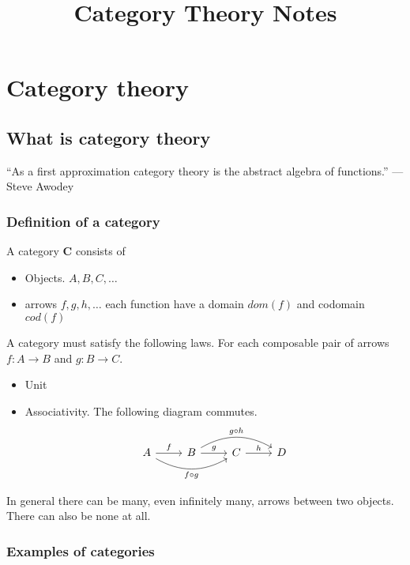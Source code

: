 \documentclass{book}
\title{Category Theory Notes}
\author{}
\theoremstyle{definition}
\begin{document}
\maketitle

\tableofcontents
\newpage

\chapter{Category theory}

\section{What is category theory}

``As a first approximation category theory is the abstract algebra of
functions.'' --- Steve Awodey

\subsection{Definition of a category}

A category $\mathbf{C}$ consists of
\begin{itemize}
\item Objects. $A, B, C, \dots$
  \item arrows $f, g, h, \dots$ each function have a domain $dom(f)$ and
    codomain $cod(f)$
\end{itemize}

A category must satisfy the following laws. For each composable pair of arrows
$f : A \to B$ and $g : B \to C$.
\begin{itemize}
  \item Unit
  \item Associativity.
    The following diagram commutes.
    \[
      \begin{tikzcd}
        A \ar[rr, bend right, "f \circ g"'] \ar[r, "f"] & \ar[rr, bend left, "g \circ h"] B \ar[r, "g"] & C \ar[r, "h"] & D
      \end{tikzcd}
    \]
\end{itemize}

In general there can be many, even infinitely many, arrows between two objects.
There can also be none at all.

\subsection{Examples of categories}
\end{document}
